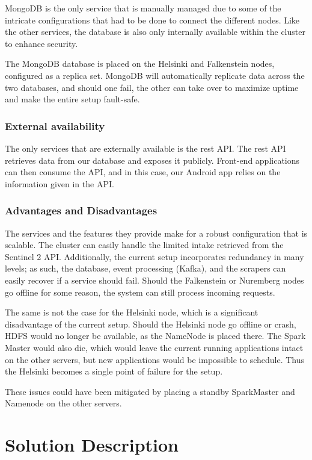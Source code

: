 MongoDB is the only service that is manually managed due to some of the intricate configurations that had to be done to connect the different nodes. Like the other services, the database is also only internally available within the cluster to enhance security. 

The MongoDB database is placed on the Helsinki and Falkenstein nodes, configured as a replica set. MongoDB will automatically replicate data across the two databases, and should one fail, the other can take over to maximize uptime and make the entire setup fault-safe. 

\subsubsection{External availability}

The only services that are externally available is the rest API. The rest API retrieves data from our database and exposes it publicly. Front-end applications can then consume the API, and in this case, our Android app relies on the information given in the API.

\subsubsection{Advantages and Disadvantages}

The services and the features they provide make for a robust configuration that is scalable. The cluster can easily handle the limited intake retrieved from the Sentinel 2 API. Additionally, the current setup incorporates redundancy in many levels; as such, the database, event processing (Kafka), and the scrapers can easily recover if a service should fail. Should the Falkenstein or Nuremberg nodes go offline for some reason, the system can still process incoming requests. 

The same is not the case for the Helsinki node, which is a significant disadvantage of the current setup. Should the Helsinki node go offline or crash, HDFS would no longer be available, as the NameNode is placed there. The Spark Master would also die, which would leave the current running applications intact on the other servers, but new applications would be impossible to schedule. Thus the Helsinki becomes a single point of failure for the setup.

These issues could have been mitigated by placing a standby SparkMaster and Namenode on the other servers.

\section{Solution Description}

